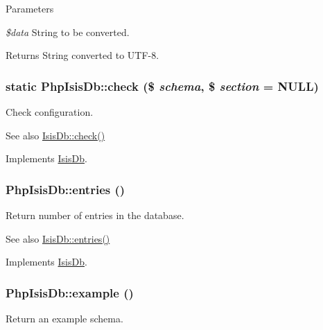 \begin{DoxyParams}{Parameters}
\item[{\em \$data}]String to be converted.\end{DoxyParams}
\begin{DoxyReturn}{Returns}
String converted to UTF-\/8. 
\end{DoxyReturn}
\hypertarget{classPhpIsisDb_a23761cc04114090a2863467b2accc80a}{
\subsubsection[{check}]{\setlength{\rightskip}{0pt plus 5cm}static PhpIsisDb::check (\$ {\em schema}, \/  \$ {\em section} = {\ttfamily NULL})}}
\label{classPhpIsisDb_a23761cc04114090a2863467b2accc80a}
Check configuration.

\begin{DoxySeeAlso}{See also}
\hyperlink{interfaceIsisDb_af681b8f990b579f1835aa7ba4c83f1b8}{IsisDb::check()} 
\end{DoxySeeAlso}


Implements \hyperlink{interfaceIsisDb_af681b8f990b579f1835aa7ba4c83f1b8}{IsisDb}.

\hypertarget{classPhpIsisDb_a0491ce84e5a85e775f811f18e63ef0fb}{
\subsubsection[{entries}]{\setlength{\rightskip}{0pt plus 5cm}PhpIsisDb::entries ()}}
\label{classPhpIsisDb_a0491ce84e5a85e775f811f18e63ef0fb}
Return number of entries in the database.

\begin{DoxySeeAlso}{See also}
\hyperlink{interfaceIsisDb_a86f38eca2b6d0835b60770d8a4e511ff}{IsisDb::entries()} 
\end{DoxySeeAlso}


Implements \hyperlink{interfaceIsisDb_a86f38eca2b6d0835b60770d8a4e511ff}{IsisDb}.

\hypertarget{classPhpIsisDb_a7f4f3a9fd6dab86bd3cb3149d65f92cd}{
\subsubsection[{example}]{\setlength{\rightskip}{0pt plus 5cm}PhpIsisDb::example ()}}
\label{classPhpIsisDb_a7f4f3a9fd6dab86bd3cb3149d65f92cd}
Return an example schema.

